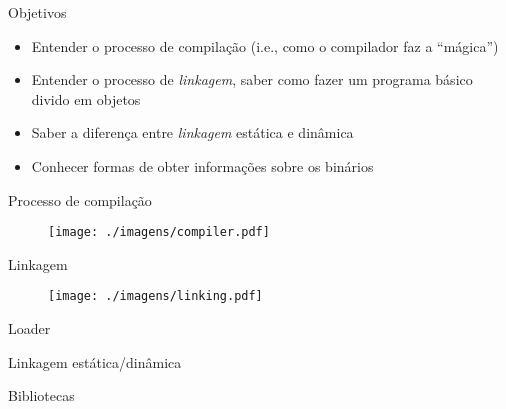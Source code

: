 \documentclass{beamer}
\begin{document}


\begin{frame}{Objetivos}
    \begin{itemize}
        \item Entender o processo de compilação (i.e., como o compilador
              faz a ``mágica'')
        \item Entender o processo de \textit{linkagem}, saber como
              fazer um programa básico divido em objetos
        \item Saber a diferença entre \textit{linkagem} estática e
              dinâmica
        \item Conhecer formas de obter informações sobre os binários
    \end{itemize}
\end{frame}

\begin{frame}{Processo de compilação}
    \begin{figure}[h]
        \centering
        \texttt{[image: ./imagens/compiler.pdf]}
    \end{figure}
\end{frame}

\begin{frame}{Linkagem}
    \begin{figure}[h]
        \centering
        \texttt{[image: ./imagens/linking.pdf]}
    \end{figure}
\end{frame}

\begin{frame}{Loader}
    
\end{frame}

\begin{frame}{Linkagem estática/dinâmica}
    
\end{frame}

\begin{frame}{Bibliotecas}
    
\end{frame}
\end{document}
